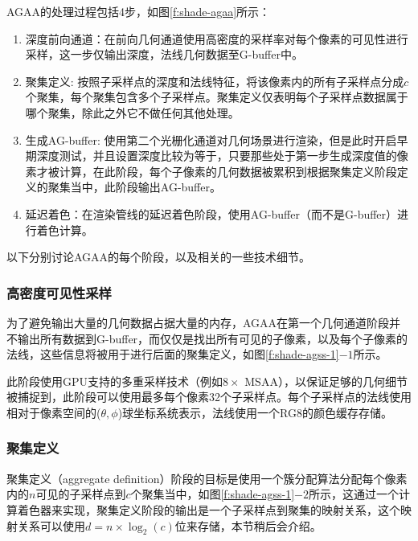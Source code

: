 AGAA的处理过程包括4步，如图\ref{f:shade-agaa}所示：

\begin{enumerate}
	\item 深度前向通道：在前向几何通道使用高密度的采样率对每个像素的可见性进行采样，这一步仅输出深度，法线几何数据至G-buffer中。
	\item 聚集定义: 按照子采样点的深度和法线特征，将该像素内的所有子采样点分成$c$个聚集，每个聚集包含多个子采样点。聚集定义仅表明每个子采样点数据属于哪个聚集，除此之外它不做任何其他处理。
	\item 生成AG-buffer: 使用第二个光栅化通道对几何场景进行渲染，但是此时开启早期深度测试，并且设置深度比较为等于，只要那些处于第一步生成深度值的像素才被计算，在此阶段，每个子像素的几何数据被累积到根据聚集定义阶段定义的聚集当中，此阶段输出AG-buffer。
	\item 延迟着色：在渲染管线的延迟着色阶段，使用AG-buffer（而不是G-buffer）进行着色计算。
\end{enumerate}

以下分别讨论AGAA的每个阶段，以及相关的一些技术细节。




\subsubsection{高密度可见性采样}
为了避免输出大量的几何数据占据大量的内存，AGAA在第一个几何通道阶段并不输出所有数据到G-buffer，而仅仅是找出所有可见的子像素，以及每个子像素的法线，这些信息将被用于进行后面的聚集定义，如图\ref{f:shade-agss-1}$-1$所示。

此阶段使用GPU支持的多重采样技术（例如$8\times$ MSAA），以保证足够的几何细节被捕捉到，此阶段可以使用最多每个像素32个子采样点。每个子采样点的法线使用相对于像素空间的($\theta,\phi$)球坐标系统表示，法线使用一个RG8的颜色缓存存储。




\subsubsection{聚集定义}
聚集定义（aggregate definition）阶段的目标是使用一个簇分配算法分配每个像素内的$n$可见的子采样点到$c$个聚集当中，如图\ref{f:shade-agss-1}$-2$所示，这通过一个计算着色器来实现，聚集定义阶段的输出是一个子采样点到聚集的映射关系，这个映射关系可以使用$d=n\times\log_2(c)$位来存储，本节稍后会介绍。

